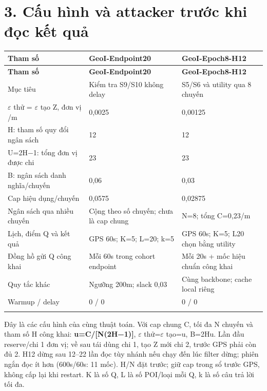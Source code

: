 \documentclass[11pt,a4paper]{article}
\begin{document}
\section*{3. Cấu hình và attacker trước khi đọc kết quả}
\begingroup\small
\begin{longtable}{@{}P{4.661cm}P{6.080cm}P{6.080cm}@{}}
\toprule
\textbf{Tham số} & \textbf{GeoI-Endpoint20} & \textbf{GeoI-Epoch8-H12}\\\midrule
\endfirsthead
\toprule
\textbf{Tham số} & \textbf{GeoI-Endpoint20} & \textbf{GeoI-Epoch8-H12}\\\midrule
\endhead\bottomrule\endfoot
Mục tiêu & Kiểm tra S9/S10 không delay & S5/S6 và utility qua 8 chuyến\\
\addlinespace[2pt]
$\varepsilon$ thử = $\varepsilon$ tạo Z, đơn vị /m & 0,0025 & 0,00125\\
\addlinespace[2pt]
H: tham số quy đổi ngân sách & 12 & 12\\
\addlinespace[2pt]
U=2H−1: tổng đơn vị được chi & 23 & 23\\
\addlinespace[2pt]
B: ngân sách danh nghĩa/chuyến & 0,06 & 0,03\\
\addlinespace[2pt]
Cap hiệu dụng/chuyến & 0,0575 & 0,02875\\
\addlinespace[2pt]
Ngân sách qua nhiều chuyến & Cộng theo số chuyến; chưa là cap chung & N=8; tổng C=0,23/m\\
\addlinespace[2pt]
Lịch, điểm Q và kết quả & GPS 60s; K=5; L=20; k=5 & GPS 60s; K=5; L20 chọn bằng utility\\
\addlinespace[2pt]
Đồng hồ gửi Q công khai & Mỗi 60s trong cohort endpoint & Mỗi 20s + mốc hiệu chuẩn công khai\\
\addlinespace[2pt]
Quy tắc khác & Ngưỡng 200m; slack 0,03 & Cùng backbone; cache local riêng\\
\addlinespace[2pt]
Warmup / delay & 0 / 0 & 0 / 0\\
\addlinespace[2pt]
\end{longtable}
\endgroup
Đây là các cấu hình của cùng thuật toán. Với cap chung C, tối đa N chuyến và tham số H công khai: \textbf{u=C/[N(2H−1)]}, $\varepsilon$ thử=$\varepsilon$ tạo=u, B=2Hu. Lần đầu reserve/chi 1 đơn vị; về sau tái dùng chi 1, tạo Z mới chi 2, trước GPS phải còn đủ 2. H12 dừng sau 12–22 lần đọc tùy nhánh nếu chạy đến lúc filter dừng; phiên ngắn đọc ít hơn (600s/60s: 11 mốc). H/N đặt trước; giữ cap trong sổ trước GPS, không cấp lại khi restart. K là số Q, L là số POI/loại mỗi Q, k là số câu trả lời tối đa.
\end{document}
